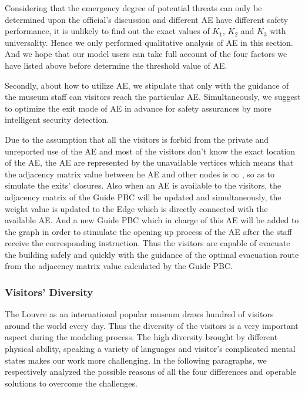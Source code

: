 \documentclass[12pt]{article}
\begin{document}
Considering that the emergency degree of potential threats can only be determined upon the official's discussion and different AE have different safety performance, it is unlikely to find out the exact values of $K_{1}$, $K_{2}$ and $K_{3}$ with universality. Hence we only performed qualitative analysis of AE in this section. And we hope that our model users can take full account of the four factors we have listed above before determine the threshold value of AE. 

Secondly, about how to utilize AE, we stipulate that only with the guidance of the museum staff can visitors reach the particular AE. Simultaneously, we suggest to optimize the exit mode of AE in advance for safety assurances by more intelligent security detection.

Due to the assumption that all the visitors is forbid from the private 
and unreported use of the AE and most of the visitors don't know the 
exact location of the AE, the AE are represented by the unavailable 
vertices which means that the adjacency matrix value between he AE 
and other nodes is $\infty$ , so as to simulate the exits' closures. 
Also when an AE is available to the visitors, the adjacency matrix of 
the Guide PBC will be updated and simultaneously, the weight value is 
updated to the Edge which is directly connected with the available AE. 
And a new Guide PBC which in charge of this AE will be 
added to the graph in order to stimulate the opening up process 
of the AE after the staff receive the corresponding instruction. 
Thus the visitors are capable of evacuate the building safely 
and quickly with the guidance of the optimal evacuation route 
from the adjacency matrix value calculated by the Guide PBC.

\subsubsection{Visitors' Diversity} \label{section:3.2.2}

The Louvre as an international popular museum draws hundred of visitors around the world every day. Thus the diversity of the visitors is a very important aspect during the modeling process. The high diversity brought by different physical ability, speaking a variety of languages and visitor's complicated mental states makes our work more challenging. In the following paragraphs, we respectively analyzed the possible reasons of all the four differences and operable solutions to overcome the challenges.
\end{document}
